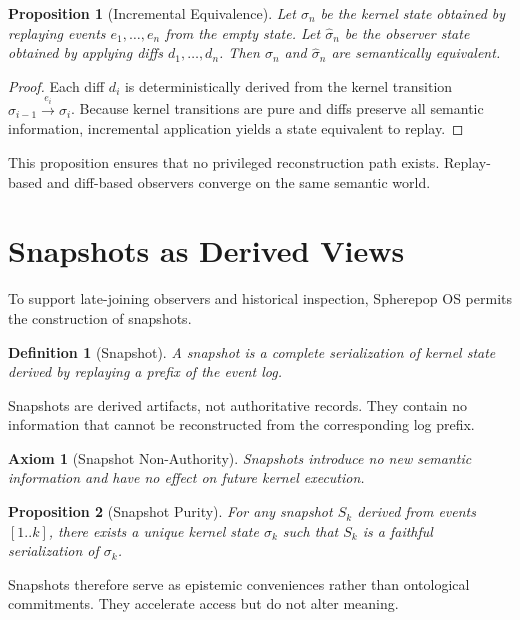 \documentclass[11pt]{article}
\newtheorem{definition}{Definition}[section]
\newtheorem{axiom}{Axiom}[section]
\newtheorem{proposition}{Proposition}[section]
\begin{document}
\begin{proposition}[Incremental Equivalence]
Let $\sigma_n$ be the kernel state obtained by replaying events
$e_1,\dots,e_n$ from the empty state. Let $\hat{\sigma}_n$ be the observer
state obtained by applying diffs $d_1,\dots,d_n$. Then $\sigma_n$ and
$\hat{\sigma}_n$ are semantically equivalent.
\end{proposition}

\begin{proof}
Each diff $d_i$ is deterministically derived from the kernel transition
$\sigma_{i-1} \xrightarrow{e_i} \sigma_i$. Because kernel transitions are
pure and diffs preserve all semantic information, incremental application
yields a state equivalent to replay.
\end{proof}

This proposition ensures that no privileged reconstruction path exists.
Replay-based and diff-based observers converge on the same semantic world.

\section{Snapshots as Derived Views}

To support late-joining observers and historical inspection, Spherepop OS
permits the construction of snapshots.

\begin{definition}[Snapshot]
A snapshot is a complete serialization of kernel state derived by replaying
a prefix of the event log.
\end{definition}

Snapshots are derived artifacts, not authoritative records. They contain no
information that cannot be reconstructed from the corresponding log prefix.

\begin{axiom}[Snapshot Non-Authority]
Snapshots introduce no new semantic information and have no effect on future
kernel execution.
\end{axiom}

\begin{proposition}[Snapshot Purity]
For any snapshot $S_k$ derived from events $[1..k]$, there exists a unique
kernel state $\sigma_k$ such that $S_k$ is a faithful serialization of
$\sigma_k$.
\end{proposition}

Snapshots therefore serve as epistemic conveniences rather than ontological
commitments. They accelerate access but do not alter meaning.
\end{document}
